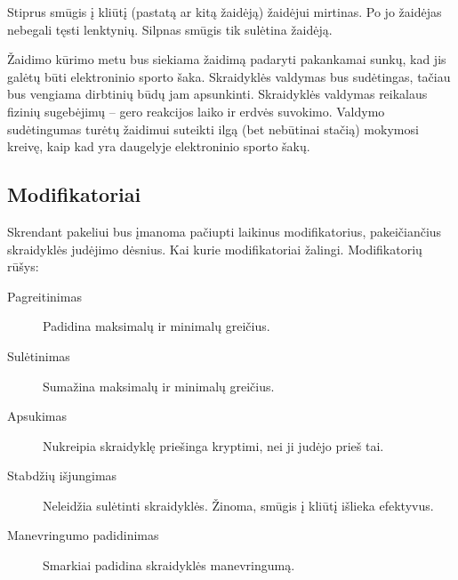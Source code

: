 Stiprus smūgis į kliūtį (pastatą ar kitą žaidėją) žaidėjui mirtinas.
Po jo žaidėjas nebegali tęsti lenktynių.
Silpnas smūgis tik sulėtina žaidėją.

Žaidimo kūrimo metu bus siekiama žaidimą padaryti pakankamai sunkų, kad jis galėtų būti elektroninio sporto šaka.
Skraidyklės valdymas bus sudėtingas, tačiau bus vengiama dirbtinių būdų jam apsunkinti.
Skraidyklės valdymas reikalaus fizinių sugebėjimų -- gero reakcijos laiko ir erdvės suvokimo.
Valdymo sudėtingumas turėtų žaidimui suteikti ilgą (bet nebūtinai stačią) mokymosi kreivę, kaip kad yra daugelyje elektroninio sporto šakų.

\subsection{Modifikatoriai}

Skrendant pakeliui bus įmanoma pačiupti laikinus modifikatorius, pakeičiančius skraidyklės judėjimo dėsnius.
Kai kurie modifikatoriai žalingi.
Modifikatorių rūšys:
\begin{description}
\item[Pagreitinimas]
    Padidina maksimalų ir minimalų greičius.
\item[Sulėtinimas]
    Sumažina maksimalų ir minimalų greičius.
\item[Apsukimas]
    Nukreipia skraidyklę priešinga kryptimi, nei ji judėjo prieš tai.
\item[Stabdžių išjungimas]
    Neleidžia sulėtinti skraidyklės.
    Žinoma, smūgis į kliūtį išlieka efektyvus.
\item[Manevringumo padidinimas]
    Smarkiai padidina skraidyklės manevringumą.
\end{description}

